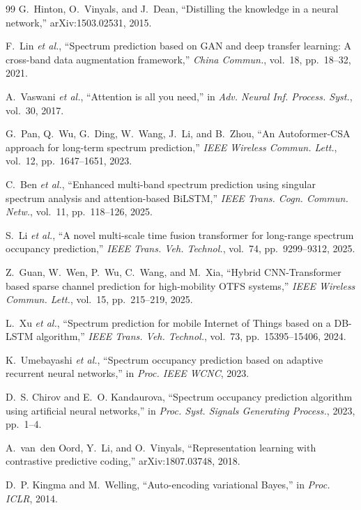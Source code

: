 \documentclass[lettersize,journal]{IEEEtran}
\begin{document}
\begin{thebibliography}{99}
 G.~Hinton, O.~Vinyals, and J.~Dean, ``Distilling the knowledge in a neural network,'' arXiv:1503.02531, 2015.

 F.~Lin \emph{et al.}, ``Spectrum prediction based on GAN and deep transfer learning: A cross-band data augmentation framework,'' \emph{China Commun.}, vol.~18, pp.~18--32, 2021.

 A.~Vaswani \emph{et al.}, ``Attention is all you need,'' in \emph{Adv. Neural Inf. Process. Syst.}, vol.~30, 2017.

 G.~Pan, Q.~Wu, G.~Ding, W.~Wang, J.~Li, and B.~Zhou, ``An Autoformer-CSA approach for long-term spectrum prediction,'' \emph{IEEE Wireless Commun. Lett.}, vol.~12, pp.~1647--1651, 2023.

 C.~Ben \emph{et al.}, ``Enhanced multi-band spectrum prediction using singular spectrum analysis and attention-based BiLSTM,'' \emph{IEEE Trans. Cogn. Commun. Netw.}, vol.~11, pp.~118--126, 2025.

 S.~Li \emph{et al.}, ``A novel multi-scale time fusion transformer for long-range spectrum occupancy prediction,'' \emph{IEEE Trans. Veh. Technol.}, vol.~74, pp.~9299--9312, 2025.

 Z.~Guan, W.~Wen, P.~Wu, C.~Wang, and M.~Xia, ``Hybrid CNN-Transformer based sparse channel prediction for high-mobility OTFS systems,'' \emph{IEEE Wireless Commun. Lett.}, vol.~15, pp.~215--219, 2025.

 L.~Xu \emph{et al.}, ``Spectrum prediction for mobile Internet of Things based on a DB-LSTM algorithm,'' \emph{IEEE Trans. Veh. Technol.}, vol.~73, pp.~15395--15406, 2024.

 K.~Umebayashi \emph{et al.}, ``Spectrum occupancy prediction based on adaptive recurrent neural networks,'' in \emph{Proc. IEEE WCNC}, 2023.

 D.~S. Chirov and E.~O. Kandaurova, ``Spectrum occupancy prediction algorithm using artificial neural networks,'' in \emph{Proc. Syst. Signals Generating Process.}, 2023, pp.~1--4.

 A.~van~den Oord, Y.~Li, and O.~Vinyals, ``Representation learning with contrastive predictive coding,'' arXiv:1807.03748, 2018.

 D.~P. Kingma and M.~Welling, ``Auto-encoding variational Bayes,'' in \emph{Proc. ICLR}, 2014.


\end{thebibliography}
\end{document}
